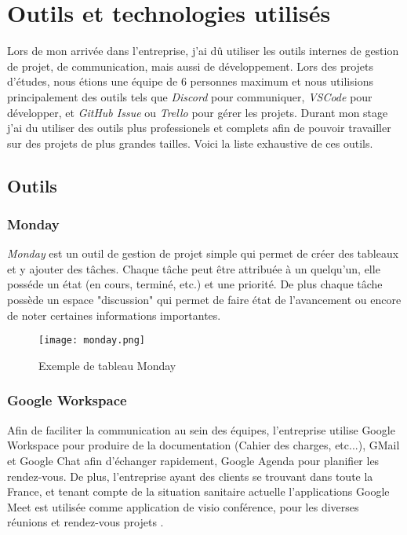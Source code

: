 \section{Outils et technologies utilisés}


Lors de mon arrivée dans l'entreprise, j'ai dû utiliser les outils internes de gestion de projet, de communication, mais aussi de développement. Lors des projets d'études, nous étions une équipe de 6 personnes maximum et nous utilisions principalement des outils tels que \textit{Discord}\cite{discord} pour communiquer, \textit{VSCode}\cite{vscode} pour développer, et \textit{GitHub Issue}\cite{github} ou \textit{Trello}\cite{trello} pour gérer les projets. Durant mon stage j'ai du utiliser des outils plus professionels et complets afin de pouvoir travailler sur des projets de plus grandes tailles. Voici la liste exhaustive de ces outils. 
\subsection{Outils}

\subsubsection{Monday}

\textit{Monday}\cite{monday} est un outil de gestion de projet simple qui permet de créer des tableaux et y ajouter des tâches.
Chaque tâche peut être attribuée à un quelqu'un, elle posséde un état (en cours, terminé, etc.) et une priorité.
De plus chaque tâche possède un espace "discussion" qui permet de faire état de l'avancement ou encore de noter certaines informations importantes. 

\begin{figure}[htbp]
    \center
    \texttt{[image: monday.png]}
    \caption{Exemple de tableau Monday}
\end{figure}

\subsubsection{Google Workspace}
Afin de faciliter la communication au sein des équipes, l'entreprise utilise Google Workspace pour produire de la documentation (Cahier des charges, etc...), GMail et Google Chat afin d'échanger rapidement, Google Agenda pour planifier les rendez-vous.
De plus, l'entreprise ayant des clients se trouvant dans toute la France, et tenant compte de la situation sanitaire actuelle l'applications Google Meet est utilisée comme application de visio conférence, pour les diverses réunions et rendez-vous projets . 

